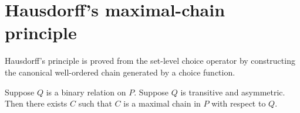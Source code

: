 \section{Hausdorff's maximal-chain principle}





Hausdorff's principle is proved from the set-level choice operator by
constructing the canonical well-ordered chain generated by a choice
function.

\begin{theorem}\label{hausdorff_maximal_chain}
    Suppose $Q$ is a binary relation on $P$.
    Suppose $Q$ is transitive and asymmetric.
    Then there exists $C$ such that $C$ is a maximal chain in $P$ with respect to $Q$.
\end{theorem}
